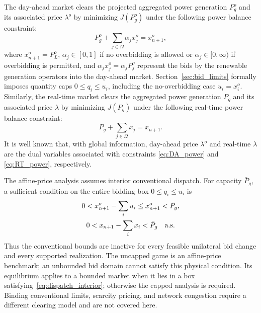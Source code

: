 \documentclass[journal]{IEEEtran}
\begin{document}
The day-ahead market clears the projected aggregated power generation $P_g^o$ and its associated price $\lambda^o$ by minimizing $J(P_g^o)$ under the following power balance constraint:
\begin{equation} 
P_g^o + \sum_{j\in\Omega} \alpha_j x_j^o  = x_{n+1}^o, \label{eq:DA_power}
\end{equation}
where $x_{n+1}^o=P_L^o$, $\alpha_j\in[0,1]$ if no overbidding is allowed or $\alpha_j\in[0,\infty)$ if overbidding is permitted, and $\alpha_j x_j^o =\alpha_j P_j^o$ represent the bids by the renewable generation operators into the day-ahead market. Section~\ref{sec:bid_limits} formally imposes quantity caps $0\leq q_i\leq u_i$, including the no-overbidding case $u_i=x_i^o$. Similarly, the real-time market clears the aggregated power generation $P_g$ and its associated price $\lambda$ by minimizing $J(P_g)$ under the following real-time power balance constraint:
\begin{equation} 
P_g + \sum_{j\in\Omega} x_j   = x_{n+1}. \label{eq:RT_power}
\end{equation}
It is well known that, with global information, day-ahead price $\lambda^o$ and real-time $\lambda$ are the dual variables associated with constraints \eqref{eq:DA_power} and \eqref{eq:RT_power}, respectively. 

The affine-price analysis assumes interior conventional dispatch. For capacity $\bar P_g$, a sufficient condition on the entire bidding box $0\leq q_i\leq u_i$ is
\begin{equation}
 \begin{gathered}0<x_{n+1}^o-\sum_i u_i\leq x_{n+1}^o<\bar P_g,\\
 0<x_{n+1}-\sum_i x_i<\bar P_g\quad\hbox{a.s.}\end{gathered}
 \label{eq:dispatch_interior}
\end{equation}
Thus the conventional bounds are inactive for every feasible unilateral bid change and every supported realization. The uncapped game is an affine-price benchmark; an unbounded bid domain cannot satisfy this physical condition. Its equilibrium applies to a bounded market when it lies in a box satisfying~\eqref{eq:dispatch_interior}; otherwise the capped analysis is required. Binding conventional limits, scarcity pricing, and network congestion require a different clearing model and are not covered here.
\end{document}
